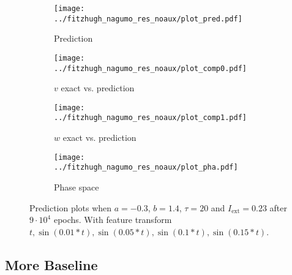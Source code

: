 \documentclass[a4paper]{article}
\begin{document}
\begin{figure}[H]
	\centering 
	\begin{subfigure}[b]{0.47\textwidth}
		\centering
		\texttt{[image: ../fitzhugh\_nagumo\_res\_noaux/plot\_pred.pdf]}
		\caption{Prediction}
		\label{fig:weight07a}
	\end{subfigure}
	\begin{subfigure}[b]{0.47\textwidth}
		\centering
		\texttt{[image: ../fitzhugh\_nagumo\_res\_noaux/plot\_comp0.pdf]}
		\caption{$v$ exact vs. prediction}
		\label{fig:weight07b}
	\end{subfigure}
	\begin{subfigure}[b]{0.47\textwidth}
		\centering
		\texttt{[image: ../fitzhugh\_nagumo\_res\_noaux/plot\_comp1.pdf]}
		\caption{$w$ exact vs. prediction}
		\label{fig:weight07c}
	\end{subfigure}
	\begin{subfigure}[b]{0.47\textwidth}
		\centering
		\texttt{[image: ../fitzhugh\_nagumo\_res\_noaux/plot\_pha.pdf]}
		\caption{Phase space}
		\label{fig:weight07d}
	\end{subfigure}
	\caption{Prediction plots when $a=-0.3$, $b=1.4$, $\tau=20$ and $ I_{\text{ext}}=0.23$ after $9\cdot10^4$ epochs. With feature transform $t, \sin(0.01 * t), \sin(0.05 * t), \sin(0.1 * t), \sin(0.15 * t)$.}
	\label{plot:weight07}
\end{figure} 	


\subsection{More Baseline}
\end{document}
